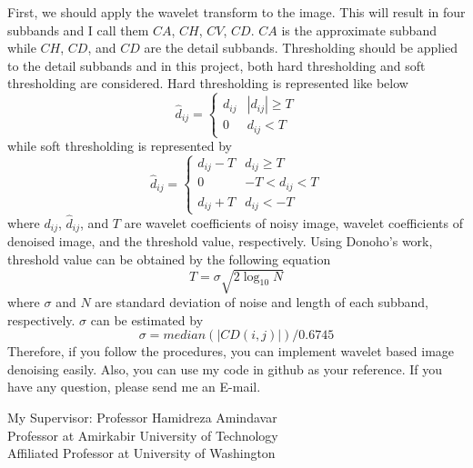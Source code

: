 \documentclass{article}
\begin{document}
First, we should apply the wavelet transform to the image. This will result in four subbands and I call them $CA$, $CH$, $CV$, $CD$. $CA$ is the approximate subband while $CH$, $CD$, and $CD$ are the detail subbands. Thresholding should be applied to the detail subbands and in this project, both hard thresholding and soft thresholding are considered. Hard thresholding is represented like below\\
\begin{equation}
\hat{d}_{ij} = 
\left\{
	\begin{array}{ll}
		d_{ij}  &  |d_{ij}| \geq T \\
		0  &  d_{ij} < T
	\end{array}
\right.
\end{equation}
while soft thresholding is represented by\\
\begin{equation}
\hat{d}_{ij} = 
\left\{
	\begin{array}{ll}
		d_{ij}-T  &  d_{ij} \geq T \\
		0  &  -T < d_{ij} < T \\
		d_{ij}+T  &  d_{ij}<-T
	\end{array}
\right.
\end{equation}
where $d_{ij}$, $\hat{d}_{ij}$, and $T$ are wavelet coefficients of noisy image, wavelet coefficients of denoised image, and the threshold value, respectively. Using Donoho's work, threshold value can be obtained by the following equation\\
\begin{equation}
T = \sigma \sqrt{2\log_{10} N}
\end{equation}
where $\sigma$ and $N$ are standard deviation of noise and length of each subband, respectively. $\sigma$ can be estimated by\\
\begin{equation}
\sigma = median(|CD(i,j)|)/0.6745
\end{equation}
Therefore, if you follow the procedures, you can implement wavelet based image denoising easily. Also, you can use my code in github as your reference. If you have any question, please send me an E-mail.
\\
\begin{center}
\large{My Supervisor: Professor Hamidreza Amindavar\\ Professor at Amirkabir University of Technology\\ Affiliated Professor at University of Washington}
\end{center}
\end{document}
